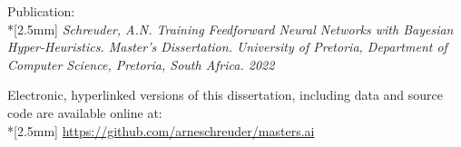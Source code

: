\pagestyle{empty}
\vspace*{\fill}
\small

\noindent
\textsf{Publication:}\\*[2.5mm]
\textsf{
    \fontsize{9}{10pt}
    \selectfont
    \textit{
        Schreuder, A.N. Training Feedforward Neural Networks with Bayesian
        Hyper-Heuristics. Master's Dissertation. University of Pretoria,
        Department of Computer Science, Pretoria, South Africa.
        2022
    }
}
\vspace{1cm}

\noindent
\textsf{Electronic, hyperlinked versions of this dissertation, including
data and source code are available online at:}\\*[2.5mm]
\textsf{
    \fontsize{9}{10pt}
    \selectfont
    \url{https://github.com/arneschreuder/masters.ai}
}
\newpage

